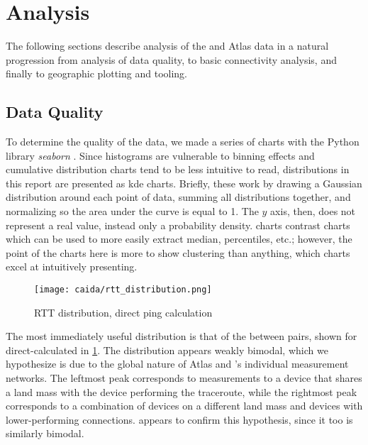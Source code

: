 \section{Analysis}\label{sec:caida_results}

The following sections describe analysis of the \caida and \ripe Atlas data in a natural progression from analysis of data quality, to basic connectivity analysis, and finally to geographic plotting and \gis tooling.

\subsection{Data Quality}\label{sec:caida_data_quality}

To determine the quality of the data, we made a series of \kde charts with the Python library \textit{seaborn} \cite{seaborn}. Since histograms are vulnerable to binning effects and cumulative distribution charts tend to be less intuitive to read, distributions in this report are presented as \acrfull{kde} charts. Briefly, these work by drawing a Gaussian distribution around each point of data, summing all distributions together, and normalizing so the area under the curve is equal to 1. The $y$ axis, then, does not represent a real value, instead only a probability density. \KDE charts contrast \cdf charts which can be used to more easily extract median, percentiles, etc.; however, the point of the charts here is more to show clustering than anything, which \kde charts excel at intuitively presenting.

\begin{figure}[t]
    \centering
    \texttt{[image: caida/rtt\_distribution.png]}
    \caption{RTT distribution, direct ping calculation}
    \label{fig:caida_rtt_distribution}
\end{figure}

The most immediately useful distribution is that of the \rtt between \ip pairs, shown for direct-calculated \rtts in \cref{fig:caida_rtt_distribution}. The distribution appears weakly bimodal, which we hypothesize is due to the global nature of \ripe Atlas and \caida's individual measurement networks. The leftmost peak corresponds to measurements to a device that shares a land mass with the device performing the traceroute, while the rightmost peak corresponds to a combination of devices on a different land mass and devices with lower-performing connections.  appears to confirm this hypothesis, since it too is similarly bimodal.

